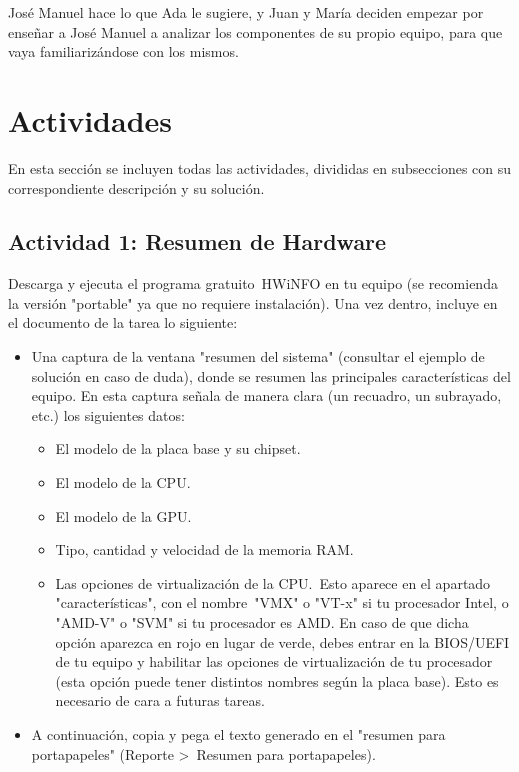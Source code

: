 José Manuel hace lo que Ada le sugiere, y Juan y María deciden empezar por enseñar a José Manuel a analizar los componentes de su propio equipo, para que vaya familiarizándose con los mismos.

\section{Actividades}
En esta sección se incluyen todas las actividades, divididas en subsecciones con su correspondiente descripción y su solución.

\subsection{Actividad 1: Resumen de Hardware}
Descarga y ejecuta el programa gratuito HWiNFO en tu equipo (se recomienda la versión "portable" ya que no requiere instalación). Una vez dentro, incluye en el documento de la tarea lo siguiente:

\begin{itemize}
    \item Una captura de la ventana "resumen del sistema" (consultar el ejemplo de solución en caso de duda), donde se resumen las principales características del equipo. En esta captura señala de manera clara (un recuadro, un subrayado, etc.) los siguientes datos:

    \begin{itemize}
        \item El modelo de la placa base y su chipset.
        \item El modelo de la CPU.
        \item El modelo de la GPU.
        \item Tipo, cantidad y velocidad de la memoria RAM.
        \item Las opciones de virtualización de la CPU. Esto aparece en el apartado "características", con el nombre "VMX" o "VT-x" si tu procesador Intel, o "AMD-V" o "SVM" si tu procesador es AMD. En caso de que dicha opción aparezca en rojo en lugar de verde, debes entrar en la BIOS/UEFI de tu equipo y habilitar las opciones de virtualización de tu procesador (esta opción puede tener distintos nombres según la placa base). Esto es necesario de cara a futuras tareas.
    \end{itemize}

    \item A continuación, copia y pega el texto generado en el "resumen para portapapeles" (Reporte > Resumen para portapapeles).
\end{itemize}

